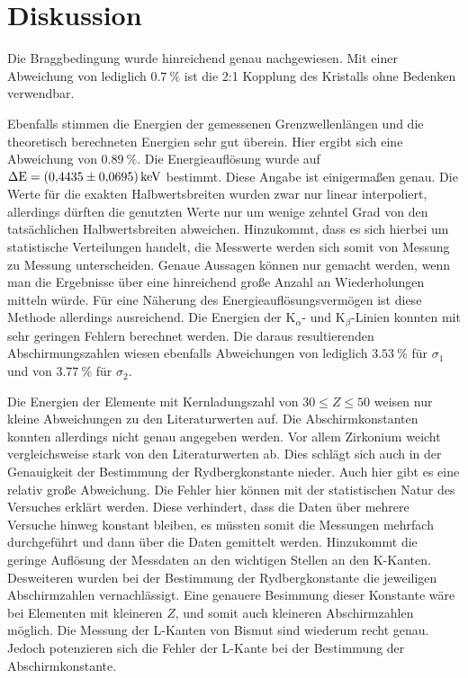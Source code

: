 \section{Diskussion}
\label{sec:Diskussion}

Die Braggbedingung wurde hinreichend genau nachgewiesen.
Mit einer Abweichung von lediglich $\SI{0.7}{\percent}$ ist die 2:1 Kopplung des Kristalls ohne Bedenken verwendbar.

Ebenfalls stimmen die Energien der gemessenen Grenzwellenlängen und die theoretisch berechneten Energien sehr gut überein.
Hier ergibt sich eine Abweichung von $\SI{0.89}{\percent}$.
Die Energieauflösung wurde auf $\Delta\text{E} = \SI{0.4435\pm0.0695}{\kilo\electronvolt}$ bestimmt.
Diese Angabe ist einigermaßen genau.
Die Werte für die exakten Halbwertsbreiten wurden zwar nur linear interpoliert, allerdings dürften die genutzten Werte nur um wenige zehntel Grad von den tatsächlichen Halbwertsbreiten abweichen.
Hinzukommt, dass es sich hierbei um statistische Verteilungen handelt, die Messwerte werden sich somit von Messung zu Messung unterscheiden.
Genaue Aussagen können nur gemacht werden, wenn man die Ergebnisse über eine hinreichend große Anzahl an Wiederholungen mitteln würde.
Für eine Näherung des Energieauflösungsvermögen ist diese Methode allerdings ausreichend.
Die Energien der K$_\alpha$- und K$_\beta$-Linien konnten mit sehr geringen Fehlern berechnet werden.
Die daraus resultierenden Abschirmungszahlen wiesen ebenfalls Abweichungen von lediglich $\SI{3.53}{\percent}$ für $\sigma_1$ und von $\SI{3.77}{\percent}$ für $\sigma_2$.

Die Energien der Elemente mit Kernladungszahl von $30 \leq Z \leq 50$ weisen nur kleine Abweichungen zu den Literaturwerten auf.
Die Abschirmkonstanten konnten allerdings nicht genau angegeben werden.
Vor allem Zirkonium weicht vergleichsweise stark von den Literaturwerten ab.
Dies schlägt sich auch in der Genauigkeit der Bestimmung der Rydbergkonstante nieder.
Auch hier gibt es eine relativ große Abweichung.
Die Fehler hier können mit der statistischen Natur des Versuches erklärt werden.
Diese verhindert, dass die Daten über mehrere Versuche hinweg konstant bleiben, es müssten somit die Messungen mehrfach durchgeführt und dann über die Daten gemittelt werden.
Hinzukommt die geringe Auflösung der Messdaten an den wichtigen Stellen an den K-Kanten.
Desweiteren wurden bei der Bestimmung der Rydbergkonstante die jeweiligen Abschirmzahlen vernachlässigt. Eine genauere Besimmung dieser Konstante wäre bei Elementen mit kleineren $Z$,
und somit auch kleineren Abschirmzahlen möglich.
Die Messung der L-Kanten von Bismut sind wiederum recht genau.
Jedoch potenzieren sich die Fehler der L-Kante bei der Bestimmung der Abschirmkonstante.
